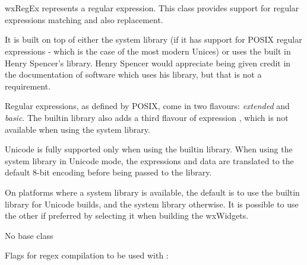 
\section{}\label{wxregex}

wxRegEx represents a regular expression.  This class provides support
for regular expressions matching and also replacement.

It is built on top of either the system library (if it has support
for POSIX regular expressions - which is the case of the most modern
Unices) or uses the built in Henry Spencer's library.  Henry Spencer
would appreciate being given credit in the documentation of software
which uses his library, but that is not a requirement.

Regular expressions, as defined by POSIX, come in two flavours: {\it extended}
and {\it basic}.  The builtin library also adds a third flavour
of expression , which is not available
when using the system library.

Unicode is fully supported only when using the builtin library.
When using the system library in Unicode mode, the expressions and data
are translated to the default 8-bit encoding before being passed to
the library.

On platforms where a system library is available, the default is to use
the builtin library for Unicode builds, and the system library otherwise.
It is possible to use the other if preferred by selecting it when building
the wxWidgets.


No base class


Flags for regex compilation to be used with :

